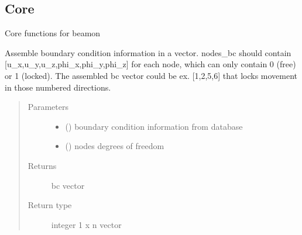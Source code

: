 \documentclass[letterpaper,10pt,english]{sphinxmanual}
\begin{document}
\subsection{Core}
\label{\detokenize{api:module-beamon.core}}\label{\detokenize{api:core}}
Core functions for beamon

\begin{fulllineitems}
\label{\detokenize{api:beamon.core.assemble_bc}}
Assemble boundary condition information in a vector.
nodes\_bc should contain {[}u\_x,u\_y,u\_z,phi\_x,phi\_y,phi\_z{]} for each node, which can only contain
0 (free) or 1 (locked).
The assembled bc vector could be ex. {[}1,2,5,6{]} that locks movement in those numbered directions.
\begin{quote}\begin{description}
\item[{Parameters}] \leavevmode\begin{itemize}
\item {} 
 () \textendash{} boundary condition information from database

\item {} 
 () \textendash{} nodes degrees of freedom

\end{itemize}

\item[{Returns}] \leavevmode
bc vector

\item[{Return type}] \leavevmode
integer 1 x n vector

\end{description}\end{quote}

\end{fulllineitems}

\end{document}
